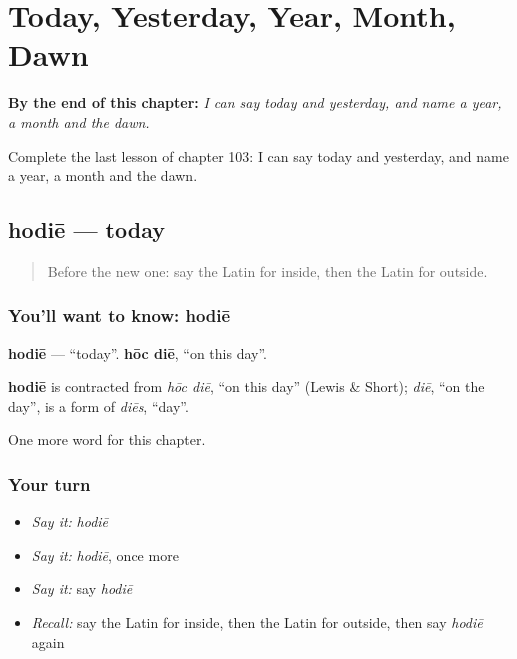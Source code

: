 
\chapter{Today, Yesterday, Year, Month, Dawn}
\label{ch:la-today-yesterday-year-month-dawn}

\begin{chapteropening}
\textbf{By the end of this chapter:} \emph{I can say today and yesterday, and name a year, a month and the dawn.}

Complete the last lesson of chapter 103: I can say today and yesterday, and name a year, a month and the dawn.
\end{chapteropening}

\section[hodiē]{hodiē — today}

\label{lesson:LA-C103-hodie}



\begin{quote}
Before the new one: say the Latin for inside, then the Latin for outside.
\end{quote}

\subsection*{You'll want to know: hodiē}
\textbf{hodiē} — \textquotedblleft{}today\textquotedblright{}. \textbf{hōc diē}, \textquotedblleft{}on this day\textquotedblright{}.

\begin{cousinweb}
\textbf{hodiē} is contracted from \emph{hōc diē}, \textquotedblleft{}on this day\textquotedblright{} (Lewis \& Short); \emph{diē}, \textquotedblleft{}on the day\textquotedblright{}, is a form of \emph{diēs}, \textquotedblleft{}day\textquotedblright{}.
\end{cousinweb}

\begin{grammarlens}[title={What you've built}]
One more word for this chapter.
\end{grammarlens}

\subsection*{Your turn}
\begin{itemize}
\raggedright
  \item \emph{Say it:} \emph{hodiē}
  \item \emph{Say it:} \emph{hodiē}, once more
  \item \emph{Say it:} say \emph{hodiē}
  \item \emph{Recall:} say the Latin for inside, then the Latin for outside, then say \emph{hodiē} again
\end{itemize}

